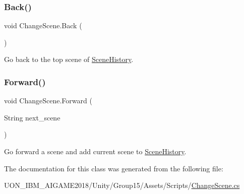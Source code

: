 \subsubsection{\texorpdfstring{Back()}{Back()}}
{\footnotesize\ttfamily void Change\+Scene.\+Back (\begin{DoxyParamCaption}{ }\end{DoxyParamCaption})\hspace{0.3cm}{\ttfamily [inline]}}



Go back to the top scene of \mbox{\hyperlink{class_scene_history}{Scene\+History}}. 

\mbox{\label{class_change_scene_a9451a67ccf1d11d95d4dd515c173d96e}} 
\subsubsection{\texorpdfstring{Forward()}{Forward()}}
{\footnotesize\ttfamily void Change\+Scene.\+Forward (\begin{DoxyParamCaption}\item[{String}]{next\+\_\+scene }\end{DoxyParamCaption})\hspace{0.3cm}{\ttfamily [inline]}}



Go forward a scene and add current scene to \mbox{\hyperlink{class_scene_history}{Scene\+History}}. 



The documentation for this class was generated from the following file\+:\begin{DoxyCompactItemize}
\item 
U\+O\+N\+\_\+\+I\+B\+M\+\_\+\+A\+I\+G\+A\+M\+E2018/\+Unity/\+Group15/\+Assets/\+Scripts/\mbox{\hyperlink{_change_scene_8cs}{Change\+Scene.\+cs}}\end{DoxyCompactItemize}
